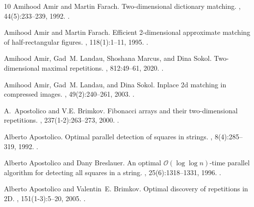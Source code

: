 \documentclass[11pt,letterpaper]{article}
\begin{document}
\begin{thebibliography}{10}
Amihood Amir and Martin Farach.
\newblock Two-dimensional dictionary matching.
, 44(5):233--239, 1992.
\newblock \href {https://doi.org/10.1016/0020-0190(92)90206-B}
  {}.

Amihood Amir and Martin Farach.
\newblock Efficient 2-dimensional approximate matching of half-rectangular
  figures.
, 118(1):1--11, 1995.
\newblock \href {https://doi.org/10.1006/INCO.1995.1047}
  {}.

Amihood Amir, Gad~M. Landau, Shoshana Marcus, and Dina Sokol.
\newblock Two-dimensional maximal repetitions.
, 812:49--61, 2020.
\newblock \href {https://doi.org/10.1016/j.tcs.2019.07.006}
  {}.

Amihood Amir, Gad~M. Landau, and Dina Sokol.
\newblock Inplace 2d matching in compressed images.
, 49(2):240--261, 2003.
\newblock \href {https://doi.org/10.1016/S0196-6774(03)00088-9}
  {}.

A.~Apostolico and V.E. Brimkov.
\newblock Fibonacci arrays and their two-dimensional repetitions.
, 237(1-2):263--273, 2000.
\newblock \href {https://doi.org/10.1016/S0304-3975(98)00182-0}
  {}.

Alberto Apostolico.
\newblock Optimal parallel detection of squares in strings.
, 8(4):285--319, 1992.
\newblock \href {https://doi.org/10.1007/BF01758848}
  {}.

Alberto Apostolico and Dany Breslauer.
\newblock An optimal $\mathcal{O}(\log\log n)$-time parallel algorithm for
  detecting all squares in a string.
, 25(6):1318--1331, 1996.
\newblock \href {https://doi.org/10.1137/S0097539793260404}
  {}.

Alberto Apostolico and Valentin~E. Brimkov.
\newblock Optimal discovery of repetitions in {2D}.
, 151(1-3):5--20, 2005.
\newblock \href {https://doi.org/10.1016/j.dam.2005.02.019}
  {}.


\end{thebibliography}
\end{document}

